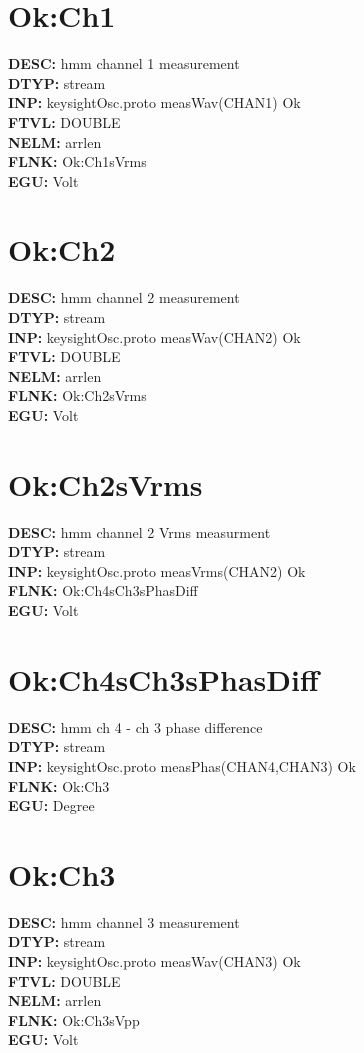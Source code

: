 \documentclass[12pt]{article}
\begin{document}
\section{Ok:Ch1}
\textbf{DESC: }hmm channel 1 measurement \\
\textbf{DTYP: }stream \\
\textbf{INP: }keysightOsc.proto measWav(CHAN1) Ok \\
\textbf{FTVL: }DOUBLE \\
\textbf{NELM: }arrlen \\
\textbf{FLNK: }Ok:Ch1sVrms \\
\textbf{EGU: }Volt \\
\newpage
\section{Ok:Ch2}
\textbf{DESC: }hmm channel 2 measurement \\
\textbf{DTYP: }stream \\
\textbf{INP: }keysightOsc.proto measWav(CHAN2) Ok \\
\textbf{FTVL: }DOUBLE \\
\textbf{NELM: }arrlen \\
\textbf{FLNK: }Ok:Ch2sVrms \\
\textbf{EGU: }Volt \\
\newpage
\section{Ok:Ch2sVrms}
\textbf{DESC: }hmm channel 2 Vrms measurment \\
\textbf{DTYP: }stream \\
\textbf{INP: }keysightOsc.proto measVrms(CHAN2) Ok \\
\textbf{FLNK: }Ok:Ch4sCh3sPhasDiff \\
\textbf{EGU: }Volt \\
\newpage
\section{Ok:Ch4sCh3sPhasDiff}
\textbf{DESC: }hmm ch 4 - ch 3 phase difference \\
\textbf{DTYP: }stream \\
\textbf{INP: }keysightOsc.proto measPhas(CHAN4,CHAN3) Ok \\
\textbf{FLNK: }Ok:Ch3 \\
\textbf{EGU: }Degree \\
\newpage
\section{Ok:Ch3}
\textbf{DESC: }hmm channel 3 measurement \\
\textbf{DTYP: }stream \\
\textbf{INP: }keysightOsc.proto measWav(CHAN3) Ok \\
\textbf{FTVL: }DOUBLE \\
\textbf{NELM: }arrlen \\
\textbf{FLNK: }Ok:Ch3sVpp \\
\textbf{EGU: }Volt \\
\newpage
\end{document}
